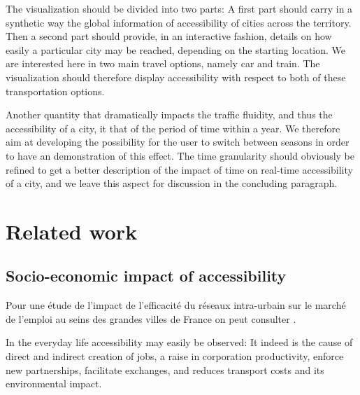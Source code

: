 \documentclass{vgtc}                          %
\begin{document}
The visualization should be divided into two parts: A first part should carry in a synthetic way the global information of accessibility of cities across the territory. Then a second part should provide, in an interactive fashion, details on how easily a particular city may be reached, depending on the starting location. We are interested here in two main travel options, namely car and train. The visualization should therefore display accessibility with respect to both of these transportation options.


 Another quantity that dramatically impacts the traffic fluidity, and thus the accessibility of a city, it that of the period of time within a year. We therefore aim at developing the possibility for the user to switch between seasons in order to have an demonstration of this effect. The time granularity should obviously be refined to get a better description of the impact of time on real-time accessibility of a city, and we leave this aspect for discussion in the concluding paragraph. 


\vspace{0.2cm}
\section{Related work}

\vspace{0.1cm}


\subsection{Socio-economic impact of accessibility}

\vspace{0.2cm}

Pour une étude de l'impact de l'efficacité du réseaux intra-urbain sur le marché de l'emploi au seins des grandes villes de France on peut consulter \cite{}.

In the everyday life accessibility may easily be observed: It indeed is the cause of direct and indirect creation of jobs, a raise in corporation productivity, enforce new partnerships, facilitate exchanges, and reduces transport costs and its environmental impact.
\end{document}
